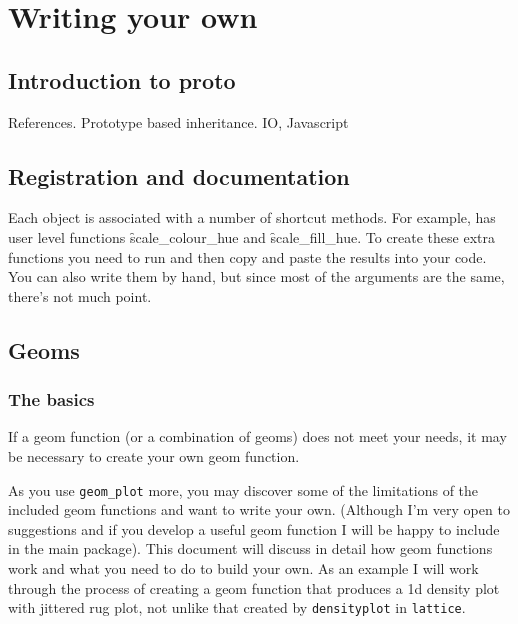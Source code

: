 

\chapter{Writing your own}

\section{Introduction to proto} %
\label{sec:introduction_to_proto}

References.
Prototype based inheritance.  IO, Javascript

\section{Registration and documentation}
\label{sec:registration_and_documentation}

Each \ggplot object is associated with a number of shortcut methods.  For example,  has user level functions \f{scale_colour_hue} and \f{scale_fill_hue}.  To create these extra functions you need to run and then copy and paste the results into your code.  You can also write them by hand, but since most of the arguments are the same, there's not much point.

\section{Geoms}\label{sec:writing_your_own}

\subsection{The basics}
\label{sub:the_basics}

If a geom function (or a combination of geoms) does not meet your needs, it may be necessary to create your own geom function.  

As you use {\tt geom\_plot} more, you may discover some of the limitations of the included geom functions and want to write your own.  (Although I'm very open to suggestions and if you develop a useful geom function I will be happy to include in the main package).  This document will discuss in detail how geom functions work and what you need to do to build your own.  As an example I will work through the process of creating a geom function that produces a 1d density plot with jittered rug plot, not unlike that created by {\tt densityplot} in {\tt lattice}.

